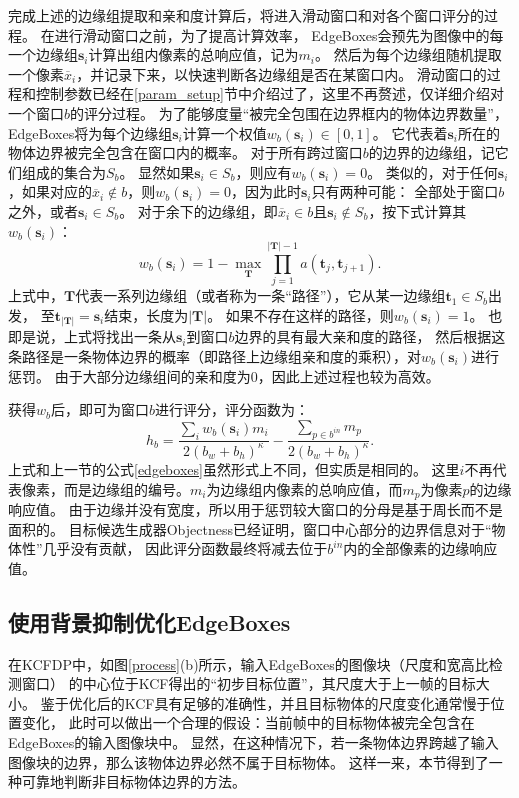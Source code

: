 完成上述的边缘组提取和亲和度计算后，将进入滑动窗口和对各个窗口评分的过程。
在进行滑动窗口之前，为了提高计算效率，
EdgeBoxes会预先为图像中的每一个边缘组$\textbf{s}_i$计算出组内像素的总响应值，记为$m_i$。
然后为每个边缘组随机提取一个像素$\overline{x}_i$，并记录下来，以快速判断各边缘组是否在某窗口内。
滑动窗口的过程和控制参数已经在\ref{param_setup}节中介绍过了，这里不再赘述，仅详细介绍对一个窗口$b$的评分过程。
为了能够度量``被完全包围在边界框内的物体边界数量''，EdgeBoxes将为每个边缘组$\textbf{s}_i$计算一个权值$w_b(\textbf{s}_i)\in [0,1]$。
它代表着$\textbf{s}_i$所在的物体边界被完全包含在窗口内的概率。
对于所有跨过窗口$b$的边界的边缘组，记它们组成的集合为$S_b$。
显然如果$\textbf{s}_i\in S_b$，则应有$w_b(\textbf{s}_i)=0$。
类似的，对于任何$\textbf{s}_i$，如果对应的$\overline{x}_i\notin b$，则$w_b(\textbf{s}_i)=0$，因为此时$\textbf{s}_i$只有两种可能：
全部处于窗口$b$之外，或者$\textbf{s}_i\in S_b$。
对于余下的边缘组，即$\overline{x}_i\in b$且$\textbf{s}_i\notin S_b$，按下式计算其$w_b(\textbf{s}_i)$：
\begin{equation}
w_b(\textbf{s}_i)=1-\max_\textbf{T}{\prod_{j=1}^{|\textbf{T}|-1}a(\textbf{t}_j,\textbf{t}_{j+1})}. \label{wbsi}
\end{equation}
上式中，$\textbf{T}$代表一系列边缘组（或者称为一条``路径''），它从某一边缘组$\textbf{t}_1\in S_b$出发，
至$\textbf{t}_{|\textbf{T}|}=\textbf{s}_i$结束，长度为$|\textbf{T}|$。
如果不存在这样的路径，则$w_b(\textbf{s}_i)=1$。
也即是说，上式将找出一条从$\textbf{s}_i$到窗口$b$边界的具有最大亲和度的路径，
然后根据这条路径是一条物体边界的概率（即路径上边缘组亲和度的乘积），对$w_b(\textbf{s}_i)$进行惩罚。
由于大部分边缘组间的亲和度为$0$，因此上述过程也较为高效。

获得$w_b$后，即可为窗口$b$进行评分，评分函数为：
\begin{equation}
	h_b = \frac{\sum_{i}w_b(\textbf{s}_i)m_i}{2(b_w+b_h)^\kappa} - \frac{\sum_{p\in b^{in}}m_p}{2(b_w+b_h)^\kappa}. \label{edgeboxes-full}
\end{equation}
上式和上一节的公式\ref{edgeboxes}虽然形式上不同，但实质是相同的。
这里$i$不再代表像素，而是边缘组的编号。$m_i$为边缘组内像素的总响应值，而$m_p$为像素$p$的边缘响应值。
由于边缘并没有宽度，所以用于惩罚较大窗口的分母是基于周长而不是面积的。
目标候选生成器Objectness已经证明，窗口中心部分的边界信息对于``物体性''几乎没有贡献，
因此评分函数最终将减去位于$b^{in}$内的全部像素的边缘响应值。

\subsection{使用背景抑制优化EdgeBoxes}
\label{backsuppresssec}
在KCFDP中，如图\ref{process}(b)所示，输入EdgeBoxes的图像块（尺度和宽高比检测窗口）
的中心位于KCF得出的``初步目标位置''，其尺度大于上一帧的目标大小。
鉴于优化后的KCF具有足够的准确性，并且目标物体的尺度变化通常慢于位置变化，
此时可以做出一个合理的假设：当前帧中的目标物体被完全包含在EdgeBoxes的输入图像块中。
显然，在这种情况下，若一条物体边界跨越了输入图像块的边界，那么该物体边界必然不属于目标物体。
这样一来，本节得到了一种可靠地判断非目标物体边界的方法。

